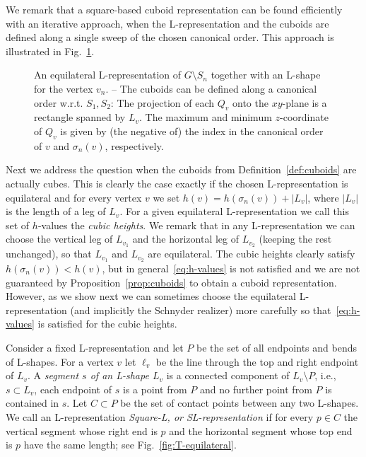 \documentclass{llncs}
\begin{document}
We remark that a square-based cuboid representation can be found efficiently with an iterative approach, when the L-representation and the cuboids are defined along a single sweep of the chosen canonical order. This approach is illustrated in Fig.~\ref{fig:cuboids}.

\begin{figure}[t!]
\centering
 \caption{ An equilateral L-representation of $G \setminus S_n$ together with an L-shape for the vertex $v_n$. -- The cuboids can be defined along a canonical order w.r.t. $S_1,S_2$: The projection of each $Q_v$ onto the $xy$-plane is a rectangle spanned by $L_v$. The maximum and minimum $z$-coordinate of $Q_v$ is given by (the negative of) the index in the canonical order of $v$ and $\sigma_n(v)$, respectively.}
 \label{fig:cuboids}
\end{figure}

Next we address the question when the cuboids from Definition~\ref{def:cuboids} are actually cubes. This is clearly the case exactly if the chosen L-representation is equilateral and for every vertex $v$ we set $h(v) = h(\sigma_n(v)) + |L_v|$, where $|L_v|$ is the length of a leg of $L_v$. For a given equilateral L-representation we call this set of $h$-values the \emph{cubic heights}. We remark that in any L-representation we can choose the vertical leg of $L_{v_1}$ and the horizontal leg of $L_{v_2}$ (keeping the rest unchanged), so that $L_{v_1}$ and $L_{v_2}$ are equilateral. The cubic heights clearly satisfy $h(\sigma_n(v)) < h(v)$, but in general~\eqref{eq:h-values} is not satisfied and we are not guaranteed by Proposition~\ref{prop:cuboids} to obtain a cuboid representation. However, as we show next we can sometimes choose the equilateral L-representation (and implicitly the Schnyder realizer) more carefully so that~\eqref{eq:h-values} is satisfied for the cubic heights.

Consider a fixed L-representation and let $P$ be the set of all endpoints and bends of L-shapes. 
For a vertex $v$ let $\ell_v$ be the line through the top and right endpoint of $L_v$. A \emph{segment $s$ of an L-shape $L_v$} is a connected component of $L_v \setminus P$, i.e., $s \subset L_v$, each endpoint of $s$ is a point from $P$ and no further point from $P$ is contained in $s$. Let $C \subset P$ be the set of contact points between any two L-shapes. We call an L-representation \emph{Square-L, or SL-representation} if for every $p \in C$ the vertical segment whose right end is $p$ and the horizontal segment whose top end is $p$ have the same length; see Fig.~\ref{fig:T-equilateral}.
\end{document}
